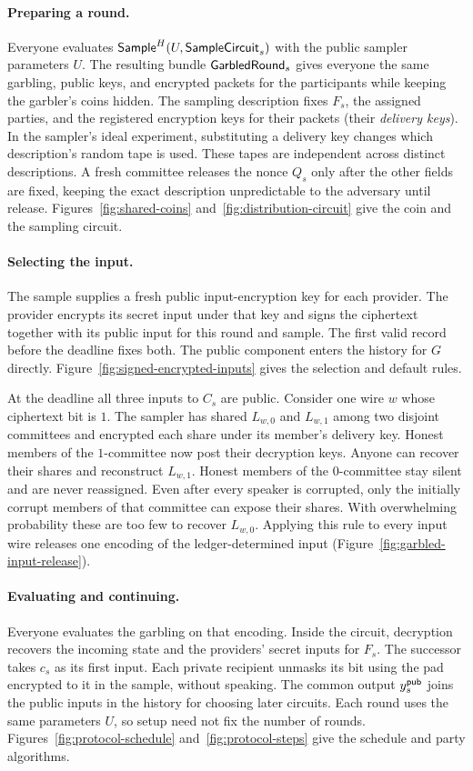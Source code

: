 \paragraph{Preparing a round.}
Everyone evaluates $\mathsf{Sample}^H(U,\mathsf{SampleCircuit}_s)$ with the public
sampler parameters $U$.  The resulting bundle $\mathsf{GarbledRound}_s$ gives
everyone the same garbling, public keys, and encrypted packets for the
participants while keeping the garbler's coins hidden.  The sampling description fixes $F_s$, the assigned
parties, and the registered encryption keys for their packets (their
\emph{delivery keys}).  In the sampler's ideal experiment, substituting
a delivery key changes which description's random tape is used.  These
tapes are independent across distinct descriptions.  A fresh committee releases
the nonce $Q_s$ only after the other fields are fixed, keeping the
exact description unpredictable to the adversary until release.
Figures~\ref{fig:shared-coins} and~\ref{fig:distribution-circuit}
give the coin and the sampling circuit.

\paragraph{Selecting the input.}
The sample supplies a fresh public input-encryption key for each provider.
The provider encrypts its secret input under that key and signs the
ciphertext together with its public input for this round and sample.
The first valid record before the deadline fixes both.  The public
component enters the history for $G$ directly.
Figure~\ref{fig:signed-encrypted-inputs} gives the selection and default rules.

At the deadline all three inputs to $C_s$ are public.  Consider one
wire $w$ whose ciphertext bit is $1$.  The sampler has shared
$L_{w,0}$ and $L_{w,1}$ among two disjoint committees and encrypted
each share under its member's delivery key.  Honest members of the
$1$-committee now post their decryption keys.  Anyone can recover
their shares and reconstruct $L_{w,1}$.  Honest members of the
$0$-committee stay silent and are never reassigned.  Even after every
speaker is corrupted, only the initially corrupt members of that
committee can expose their shares.  With overwhelming probability these
are too few to recover $L_{w,0}$.  Applying this rule to every input
wire releases one encoding of the ledger-determined input
(Figure~\ref{fig:garbled-input-release}).

\paragraph{Evaluating and continuing.}
Everyone evaluates the garbling on that encoding.  Inside the circuit,
decryption recovers the incoming state and the providers' secret inputs
for $F_s$.  The successor takes $c_s$ as its first input.
Each private recipient unmasks its bit using
the pad encrypted to it in the sample, without speaking.  The common
output $y^{\mathsf{pub}}_s$ joins the public inputs in the history for choosing
later circuits.  Each round uses the same parameters $U$, so setup
need not fix the number of rounds.
Figures~\ref{fig:protocol-schedule} and~\ref{fig:protocol-steps} give
the schedule and party algorithms.
